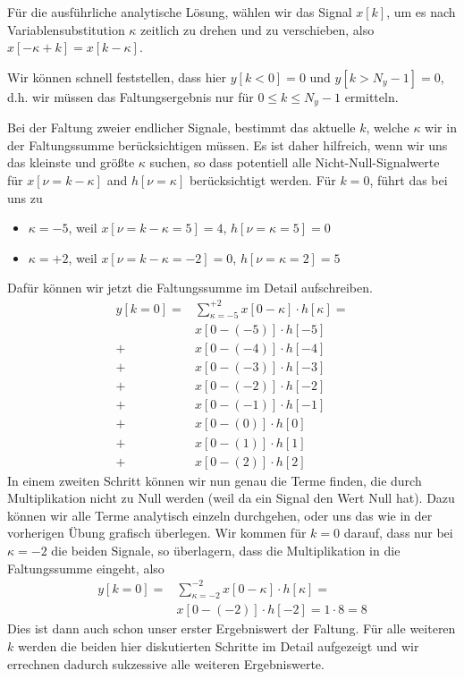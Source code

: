 \clearpage
Für die ausführliche analytische Lösung, wählen wir das Signal $x[k]$,
um es nach Variablensubstitution $\kappa$ zeitlich
zu drehen und zu verschieben, also $x[-\kappa+k]=x[k-\kappa]$.

Wir können schnell feststellen, dass hier $y[k<0]=0$ und $y[k>N_y-1]=0$, d.h.
wir müssen das Faltungsergebnis nur für $0\leq k \leq N_y-1$ ermitteln.

Bei der Faltung zweier endlicher Signale, bestimmt das aktuelle $k$, welche $\kappa$
wir in der Faltungssumme berücksichtigen müssen.
Es ist daher hilfreich, wenn wir uns das kleinste und größte $\kappa$ suchen,
so dass potentiell alle Nicht-Null-Signalwerte für $x[\nu=k-\kappa]$ and $h[\nu=\kappa]$
berücksichtigt werden.
Für $k=0$, führt das bei uns zu
\begin{itemize}
\item $\kappa=-5$, weil $x[\nu=k-\kappa=5]=4$, $h[\nu=\kappa=5]=0$
\item $\kappa=+2$, weil $x[\nu=k-\kappa=-2]=0$, $h[\nu=\kappa=2]=5$
\end{itemize}
Dafür können wir jetzt die Faltungssumme im Detail aufschreiben.
\begin{align}
y[k=0] = &\sum\limits_{\kappa = -5}^{+2} x[0 -\kappa] \cdot h[\kappa] =\\
&x[0 -(-5)] \cdot h[-5]\nonumber\\
+&x[0 -(-4)] \cdot h[-4]\nonumber\\
+&x[0 -(-3)] \cdot h[-3]\nonumber\\
+&x[0 -(-2)] \cdot h[-2]\nonumber\\
+&x[0 -(-1)] \cdot h[-1]\nonumber\\
+&x[0 -(0)] \cdot h[0]\nonumber\\
+&x[0 -(1)] \cdot h[1]\nonumber\\
+&x[0 -(2)] \cdot h[2]
\end{align}
In einem zweiten Schritt können wir nun genau die Terme finden, die durch
Multiplikation nicht zu Null werden (weil da ein Signal den Wert Null hat).
Dazu können wir alle Terme analytisch einzeln durchgehen, oder uns das wie
in der vorherigen Übung grafisch überlegen.
Wir kommen für $k=0$ darauf, dass nur bei $\kappa=-2$ die beiden Signale, so
überlagern, dass die Multiplikation in die Faltungssumme eingeht, also
\begin{align}
y[k=0] = & \sum\limits_{\kappa = -2}^{-2} x[0 -\kappa] \cdot h[\kappa] =\\
&x[0 -(-2)] \cdot h[-2] = 1 \cdot 8 = 8\nonumber
\end{align}
Dies ist dann auch schon unser erster Ergebniswert der Faltung. Für alle weiteren
$k$ werden die beiden hier diskutierten Schritte im Detail aufgezeigt und
wir errechnen dadurch sukzessive alle weiteren Ergebniswerte.

